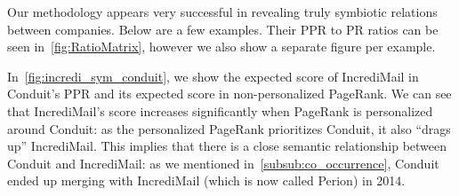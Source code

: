 \documentclass[ijoc,nonblindrev]{informs3} %
\numberwithin{equation}{subsection}
\begin{document}
Our methodology appears very successful in revealing truly symbiotic relations between companies. Below are a few examples. Their PPR to PR ratios can be seen in~\autoref{fig:RatioMatrix}, however we also show a separate figure per example.

In~\autoref{fig:incredi_sym_conduit}, we show the expected score of IncrediMail in Conduit's PPR and its expected score in non-personalized PageRank. We can see that IncrediMail's score increases significantly when PageRank is personalized around Conduit: as the personalized PageRank prioritizes Conduit, it also ``drags up'' IncrediMail. This implies that there is a close semantic relationship between Conduit and IncrediMail: as we mentioned in~\autoref{subsub:co_occurrence}, Conduit ended up merging with IncrediMail (which is now called Perion) in 2014. 
\end{document}
